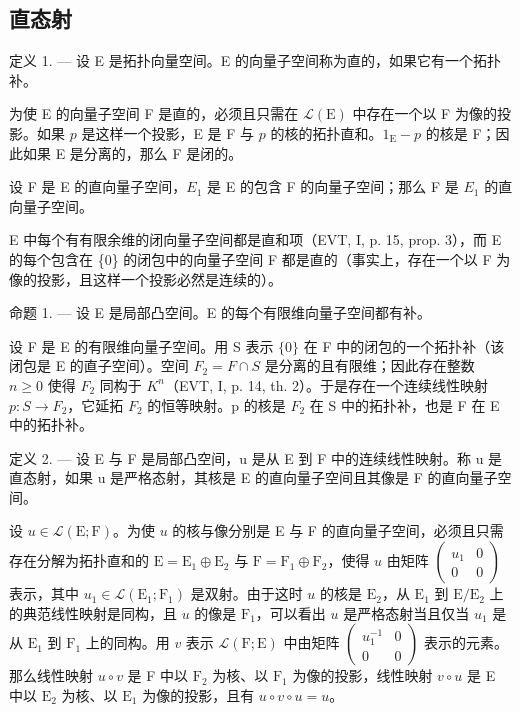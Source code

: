 \subsection{直态射}

定义 1. --- 设 E 是拓扑向量空间。E 的向量子空间称为直的，如果它有一个拓扑补。

为使 E 的向量子空间 F 是直的，必须且只需在 \(\mathcal{L}(\mathrm{E})\) 中存在一个以 F 为像的投影。如果 \(p\) 是这样一个投影，E 是 F 与 \(p\) 的核的拓扑直和。\(1_{\mathrm{E}} - p\) 的核是 F；因此如果 E 是分离的，那么 F 是闭的。

设 F 是 E 的直向量子空间，\(E_{1}\) 是 E 的包含 F 的向量子空间；那么 F 是 \(E_{1}\) 的直向量子空间。

E 中每个有有限余维的闭向量子空间都是直和项（EVT, I, p. 15, prop. 3），而 E 的每个包含在 \{0\} 的闭包中的向量子空间 F 都是直的（事实上，存在一个以 F 为像的投影，且这样一个投影必然是连续的）。

命题 1. --- 设 E 是局部凸空间。E 的每个有限维向量子空间都有补。

设 F 是 E 的有限维向量子空间。用 S 表示 \(\{0\}\) 在 F 中的闭包的一个拓扑补（该闭包是 E 的直子空间）。空间 \(F_{2} = F \cap S\) 是分离的且有限维；因此存在整数 \(n \geqslant 0\) 使得 \(F_{2}\) 同构于 \(K^{n}\)（EVT, I, p. 14, th. 2）。于是存在一个连续线性映射 \(p: S \to F_{2}\)，它延拓 \(F_{2}\) 的恒等映射。p 的核是 \(F_{2}\) 在 S 中的拓扑补，也是 F 在 E 中的拓扑补。

定义 2. --- 设 E 与 F 是局部凸空间，u 是从 E 到 F 中的连续线性映射。称 u 是直态射，如果 u 是严格态射，其核是 E 的直向量子空间且其像是 F 的直向量子空间。

设 \(u \in \mathcal{L}(\mathrm{E};\mathrm{F})\)。为使 \(u\) 的核与像分别是 E 与 F 的直向量子空间，必须且只需存在分解为拓扑直和的 \(\mathrm{E} = \mathrm{E}_1 \oplus \mathrm{E}_2\) 与 \(\mathrm{F} = \mathrm{F}_1 \oplus \mathrm{F}_2\)，使得 \(u\) 由矩阵 \(\begin{pmatrix} u_1 & 0 \\ 0 & 0 \end{pmatrix}\) 表示，其中 \(u_1 \in \mathcal{L}(\mathrm{E}_1; \mathrm{F}_1)\) 是双射。由于这时 \(u\) 的核是 \(\mathrm{E}_2\)，从 \(\mathrm{E}_1\) 到 \(\mathrm{E}/\mathrm{E}_2\) 上的典范线性映射是同构，且 \(u\) 的像是 \(\mathrm{F}_1\)，可以看出 \(u\) 是严格态射当且仅当 \(u_1\) 是从 \(\mathrm{E}_1\) 到 \(\mathrm{F}_1\) 上的同构。用 \(v\) 表示 \(\mathcal{L}(\mathrm{F};\mathrm{E})\) 中由矩阵 \(\begin{pmatrix} u_1^{-1} & 0 \\ 0 & 0 \end{pmatrix}\) 表示的元素。那么线性映射 \(u \circ v\) 是 F 中以 \(\mathrm{F}_2\) 为核、以 \(\mathrm{F}_1\) 为像的投影，线性映射 \(v \circ u\) 是 E 中以 \(\mathrm{E}_2\) 为核、以 \(\mathrm{E}_1\) 为像的投影，且有 \(u \circ v \circ u = u\)。

